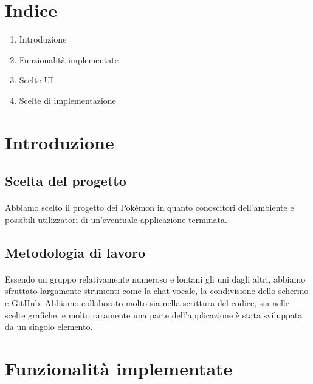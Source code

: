 \documentclass[a4paper,11pt]{article}
\begin{document}
	\section{Indice}
		\begin{enumerate}
			\item Introduzione
			\item Funzionalità implementate
			\item Scelte UI
			\item Scelte di implementazione
		\end{enumerate}
	\newpage
	
	\section{Introduzione}
		\subsection{Scelta del progetto}
			\paragraph{}
				Abbiamo scelto il progetto dei Pokémon in quanto conoscitori dell’ambiente e possibili utilizzatori di un’eventuale applicazione terminata.
		\subsection{Metodologia di lavoro}
			\paragraph{}
				Essendo un gruppo relativamente numeroso e lontani gli uni dagli altri, abbiamo sfruttato largamente strumenti come la chat vocale, la condivisione dello schermo e GitHub. Abbiamo collaborato molto sia nella scrittura del codice, sia nelle scelte grafiche, e molto raramente una parte dell’applicazione è stata sviluppata da un singolo elemento.\newpage
	
	\section{Funzionalità implementate}
\end{document}

